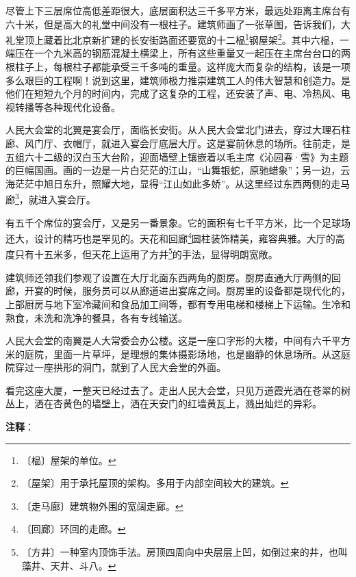 \documentclass[12pt,UTF-8,openany]{ctexbook}
\begin{document}
\begin{normalsize}
    尽管上下三层席位高低差距很大，底层面积达三千多平方米，最远处距离主席台有六十米，但是高大的礼堂中间没有一根柱子。建筑师画了一张草图，告诉我们，大礼堂顶上藏着比北京新扩建的长安街路面还要宽的十二榀\footnote{〔榀〕屋架的单位。}钢屋架\footnote{〔屋架〕用于承托屋顶的架构。多用于内部空间较大的建筑。}。其中六榀，一端压在一个九米高的钢筋混凝土横梁上，所有这些重量又一起压在主席台台口的两根柱子上，每根柱子都能承受三千多吨的重量。这样庞大而复杂的结构，该是一项多么艰巨的工程啊！说到这里，建筑师极力推崇建筑工人的伟大智慧和创造力。是他们在短短九个月的时间内，完成了这复杂的工程，还安装了声、电、冷热风、电视转播等各种现代化设备。
    
    人民大会堂的北翼是宴会厅，面临长安街。从人民大会堂北门进去，穿过大理石柱廊、风门厅、衣帽厅，就进入宴会厅底层大厅。这是宴前休息的场所。往前走，是五组六十二级的汉白玉大台阶，迎面墙壁上镶嵌着以毛主席《沁园春·雪》为主题的巨幅国画。画的一边是一片白茫茫的江山，“山舞银蛇，原驰蜡象”；另一边，云海茫茫中旭日东升，照耀大地，显得“江山如此多娇”。从这里经过东西两侧的走马廊\footnote{〔走马廊〕建筑物外围的宽阔走廊。}，就进入宴会厅。
    
    有五千个席位的宴会厅，又是另一番景象。它的面积有七千平方米，比一个足球场还大，设计的精巧也是罕见的。天花和回廊\footnote{〔回廊〕环回的走廊。}圆柱装饰精美，雍容典雅。大厅的高度只有十五米多，但天花上运用了方井\footnote{〔方井〕一种室内顶饰手法。房顶四周向中央层层上凹，如倒过来的井，也叫藻井、天井、斗八。}的手法，显得明朗宽敞。
    
    建筑师还领我们参观了设置在大厅北面东西两角的厨房。厨房直通大厅两侧的回廊，开宴的时候，服务员可以从廊道进出宴席之间。厨房里的设备都是现代化的，上部厨房与地下室冷藏间和食品加工间等，都有专用电梯和楼梯上下运输。生冷和熟食，未洗和洗净的餐具，各有专线输送。
    
    人民大会堂的南翼是人大常委会办公楼。这是一座口字形的大楼，中间有六千平方米的庭院，里面一片草坪，是理想的集体摄影场地，也是幽静的休息场所。从这庭院穿过一座拱形的洞门，就到了人民大会堂的外面。
    
    看完这座大厦，一整天已经过去了。走出人民大会堂，只见万道霞光洒在苍翠的树丛上，洒在杏黄色的墙壁上，洒在天安门的红墙黄瓦上，溅出灿烂的异彩。
    
\end{normalsize}


\newpage

\textbf{注释}：

\vspace{-1em}
\end{document}
